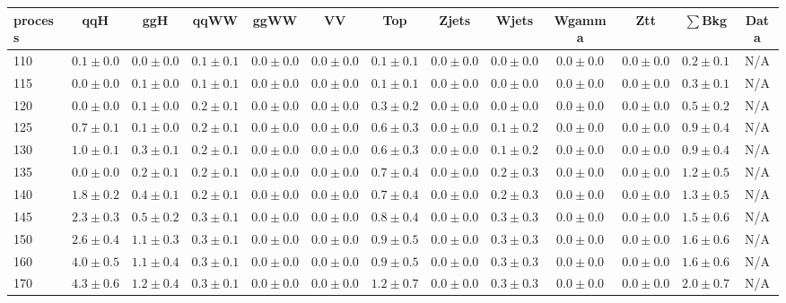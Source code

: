\begin{table}
{%
 \tiny
 \begin{center}
 \begin{tabular}{l | c c | c c c c c c c c  | c c}
 \hline
 process & qqH & ggH & qqWW & ggWW & VV & Top & Zjets & Wjets & Wgamma & Ztt & $\sum$Bkg & Data \\
 \hline
110 & $0.1\pm0.0$ & $0.0\pm0.0$ & $0.1\pm0.1$ & $0.0\pm0.0$ & $0.0\pm0.0$ & $0.1\pm0.1$ & $0.0\pm0.0$ & $0.0\pm0.0$ & $0.0\pm0.0$ & $0.0\pm0.0$ & $0.2\pm0.1$ & N/A \\
115 & $0.0\pm0.0$ & $0.1\pm0.0$ & $0.1\pm0.1$ & $0.0\pm0.0$ & $0.0\pm0.0$ & $0.1\pm0.1$ & $0.0\pm0.0$ & $0.0\pm0.0$ & $0.0\pm0.0$ & $0.0\pm0.0$ & $0.3\pm0.1$ & N/A \\
120 & $0.0\pm0.0$ & $0.1\pm0.0$ & $0.2\pm0.1$ & $0.0\pm0.0$ & $0.0\pm0.0$ & $0.3\pm0.2$ & $0.0\pm0.0$ & $0.0\pm0.0$ & $0.0\pm0.0$ & $0.0\pm0.0$ & $0.5\pm0.2$ & N/A \\
125 & $0.7\pm0.1$ & $0.1\pm0.0$ & $0.2\pm0.1$ & $0.0\pm0.0$ & $0.0\pm0.0$ & $0.6\pm0.3$ & $0.0\pm0.0$ & $0.1\pm0.2$ & $0.0\pm0.0$ & $0.0\pm0.0$ & $0.9\pm0.4$ & N/A \\
130 & $1.0\pm0.1$ & $0.3\pm0.1$ & $0.2\pm0.1$ & $0.0\pm0.0$ & $0.0\pm0.0$ & $0.6\pm0.3$ & $0.0\pm0.0$ & $0.1\pm0.2$ & $0.0\pm0.0$ & $0.0\pm0.0$ & $0.9\pm0.4$ & N/A \\
135 & $0.0\pm0.0$ & $0.2\pm0.1$ & $0.2\pm0.1$ & $0.0\pm0.0$ & $0.0\pm0.0$ & $0.7\pm0.4$ & $0.0\pm0.0$ & $0.2\pm0.3$ & $0.0\pm0.0$ & $0.0\pm0.0$ & $1.2\pm0.5$ & N/A \\
140 & $1.8\pm0.2$ & $0.4\pm0.1$ & $0.2\pm0.1$ & $0.0\pm0.0$ & $0.0\pm0.0$ & $0.7\pm0.4$ & $0.0\pm0.0$ & $0.2\pm0.3$ & $0.0\pm0.0$ & $0.0\pm0.0$ & $1.3\pm0.5$ & N/A \\
145 & $2.3\pm0.3$ & $0.5\pm0.2$ & $0.3\pm0.1$ & $0.0\pm0.0$ & $0.0\pm0.0$ & $0.8\pm0.4$ & $0.0\pm0.0$ & $0.3\pm0.3$ & $0.0\pm0.0$ & $0.0\pm0.0$ & $1.5\pm0.6$ & N/A \\
150 & $2.6\pm0.4$ & $1.1\pm0.3$ & $0.3\pm0.1$ & $0.0\pm0.0$ & $0.0\pm0.0$ & $0.9\pm0.5$ & $0.0\pm0.0$ & $0.3\pm0.3$ & $0.0\pm0.0$ & $0.0\pm0.0$ & $1.6\pm0.6$ & N/A \\
160 & $4.0\pm0.5$ & $1.1\pm0.4$ & $0.3\pm0.1$ & $0.0\pm0.0$ & $0.0\pm0.0$ & $0.9\pm0.5$ & $0.0\pm0.0$ & $0.3\pm0.3$ & $0.0\pm0.0$ & $0.0\pm0.0$ & $1.6\pm0.6$ & N/A \\
170 & $4.3\pm0.6$ & $1.2\pm0.4$ & $0.3\pm0.1$ & $0.0\pm0.0$ & $0.0\pm0.0$ & $1.2\pm0.7$ & $0.0\pm0.0$ & $0.3\pm0.3$ & $0.0\pm0.0$ & $0.0\pm0.0$ & $2.0\pm0.7$ & N/A \\

\end{tabular}
\end{center}}
\end{table}
